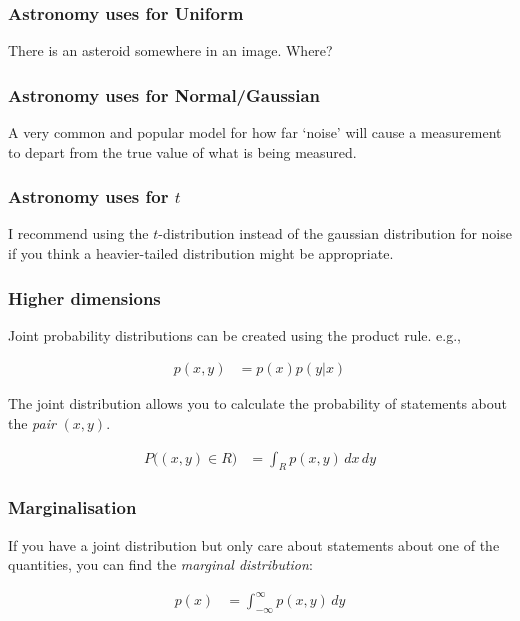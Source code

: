 \documentclass{beamer}
\begin{document}
\begin{frame}[t, fragile]
\frametitle{Astronomy uses for Uniform}

There is an asteroid somewhere in an image. Where?

\end{frame}


\begin{frame}[t, fragile]
\frametitle{Astronomy uses for Normal/Gaussian}

A very common and popular model for how far `noise' will cause a
measurement to depart from the true value of what is being measured.

\end{frame}

\begin{frame}[t, fragile]
\frametitle{Astronomy uses for $t$}

I recommend using the $t$-distribution instead of the gaussian
distribution for noise if you think a heavier-tailed distribution might
be appropriate.

\end{frame}



\begin{frame}[t, fragile]
\frametitle{Higher dimensions}

Joint probability distributions can be created using the product rule.
e.g.,

\begin{align}
p(x, y) &= p(x) p(y | x)
\end{align}

The joint distribution allows you to calculate the probability of statements
about the {\em pair} $(x, y)$.

\begin{align}
P\big((x, y) \in R\big) &= \int_R p(x, y) \, dx \, dy
\end{align}



\end{frame}


\begin{frame}[t, fragile]
\frametitle{Marginalisation}

If you have a joint distribution but only care about statements about one of
the quantities, you can find the {\em marginal distribution}:\vspace{2em}

\begin{align}
p(x) &= \int_{-\infty}^{\infty} p(x, y) \, dy
\end{align}



\end{frame}
\end{document}
